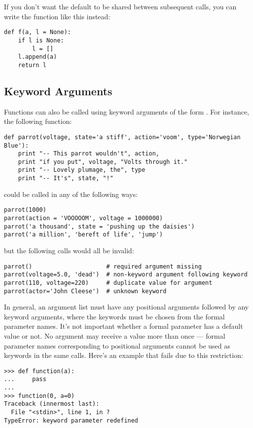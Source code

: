 \documentclass{manual}
\begin{document}
If you don't want the default to be shared between subsequent calls,
you can write the function like this instead:

\begin{verbatim}
def f(a, l = None):
    if l is None:
        l = []
    l.append(a)
    return l
\end{verbatim}

\subsection{Keyword Arguments \label{keywordArgs}}

Functions can also be called using
keyword arguments of the form .  For
instance, the following function:

\begin{verbatim}
def parrot(voltage, state='a stiff', action='voom', type='Norwegian Blue'):
    print "-- This parrot wouldn't", action,
    print "if you put", voltage, "Volts through it."
    print "-- Lovely plumage, the", type
    print "-- It's", state, "!"
\end{verbatim}

could be called in any of the following ways:

\begin{verbatim}
parrot(1000)
parrot(action = 'VOOOOOM', voltage = 1000000)
parrot('a thousand', state = 'pushing up the daisies')
parrot('a million', 'bereft of life', 'jump')
\end{verbatim}

but the following calls would all be invalid:

\begin{verbatim}
parrot()                     # required argument missing
parrot(voltage=5.0, 'dead')  # non-keyword argument following keyword
parrot(110, voltage=220)     # duplicate value for argument
parrot(actor='John Cleese')  # unknown keyword
\end{verbatim}

In general, an argument list must have any positional arguments
followed by any keyword arguments, where the keywords must be chosen
from the formal parameter names.  It's not important whether a formal
parameter has a default value or not.  No argument may receive a
value more than once --- formal parameter names corresponding to
positional arguments cannot be used as keywords in the same calls.
Here's an example that fails due to this restriction:

\begin{verbatim}
>>> def function(a):
...     pass
... 
>>> function(0, a=0)
Traceback (innermost last):
  File "<stdin>", line 1, in ?
TypeError: keyword parameter redefined
\end{verbatim}
\end{document}
